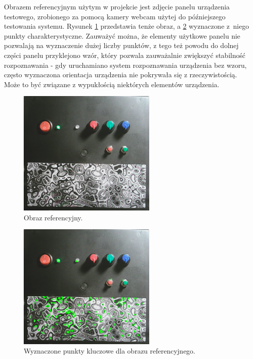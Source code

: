 \documentclass[12pt,twoside,polish]{article}
\begin{document}
Obrazem referencyjnym użytym w projekcie jest zdjęcie panelu urządzenia testowego, zrobionego za pomocą kamery webcam użytej do późniejszego testowania systemu. Rysunek \ref{base_img} przedstawia tenże obraz, a \ref{base_img_kp} wyznaczone z~niego punkty charakterystyczne. Zauważyć można, że elementy użytkowe panelu nie pozwalają na wyznaczenie dużej liczby punktów, z tego też powodu do dolnej części panelu przyklejono wzór, który pozwala zauważalnie zwiększyć stabilność rozpoznawania - gdy uruchamiano system rozpoznawania urządzenia bez wzoru, często wyznaczona orientacja urządzenia nie pokrywała się z rzeczywistością. Może to być związane z wypukłością niektórych elementów urządzenia.
\begin{figure}[h]
	\centering
	\includegraphics[width=0.6\textwidth]{base}
	\caption{Obraz referencyjny.}
	\label{base_img}
\end{figure}
\begin{figure}[h]
	\centering
	\includegraphics[width=0.6\textwidth]{base_kp}
	\caption{Wyznaczone punkty kluczowe dla obrazu referencyjnego.}
	\label{base_img_kp}
\end{figure}
\end{document}

